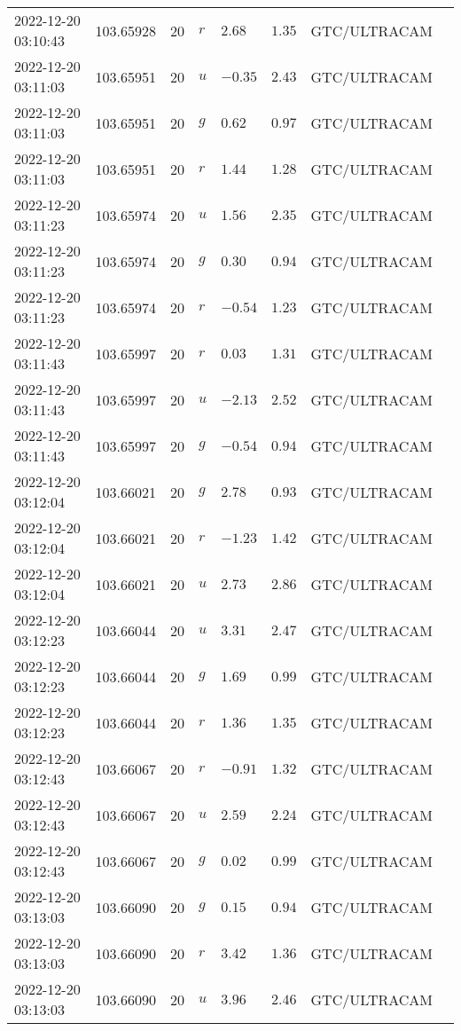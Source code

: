 \documentclass{nature_plusfigure}
\begin{document}
\begin{supplement}
\begin{center}
\begin{longtable}{llllllll}
2022-12-20 03:10:43 & 103.65928 & 20 & $r$ & $2.68$ & $1.35$ & GTC/ULTRACAM &  \\ 
2022-12-20 03:11:03 & 103.65951 & 20 & $u$ & $-0.35$ & $2.43$ & GTC/ULTRACAM &  \\ 
2022-12-20 03:11:03 & 103.65951 & 20 & $g$ & $0.62$ & $0.97$ & GTC/ULTRACAM &  \\ 
2022-12-20 03:11:03 & 103.65951 & 20 & $r$ & $1.44$ & $1.28$ & GTC/ULTRACAM &  \\ 
2022-12-20 03:11:23 & 103.65974 & 20 & $u$ & $1.56$ & $2.35$ & GTC/ULTRACAM &  \\ 
2022-12-20 03:11:23 & 103.65974 & 20 & $g$ & $0.30$ & $0.94$ & GTC/ULTRACAM &  \\ 
2022-12-20 03:11:23 & 103.65974 & 20 & $r$ & $-0.54$ & $1.23$ & GTC/ULTRACAM &  \\ 
2022-12-20 03:11:43 & 103.65997 & 20 & $r$ & $0.03$ & $1.31$ & GTC/ULTRACAM &  \\ 
2022-12-20 03:11:43 & 103.65997 & 20 & $u$ & $-2.13$ & $2.52$ & GTC/ULTRACAM &  \\ 
2022-12-20 03:11:43 & 103.65997 & 20 & $g$ & $-0.54$ & $0.94$ & GTC/ULTRACAM &  \\ 
2022-12-20 03:12:04 & 103.66021 & 20 & $g$ & $2.78$ & $0.93$ & GTC/ULTRACAM &  \\ 
2022-12-20 03:12:04 & 103.66021 & 20 & $r$ & $-1.23$ & $1.42$ & GTC/ULTRACAM &  \\ 
2022-12-20 03:12:04 & 103.66021 & 20 & $u$ & $2.73$ & $2.86$ & GTC/ULTRACAM &  \\ 
2022-12-20 03:12:23 & 103.66044 & 20 & $u$ & $3.31$ & $2.47$ & GTC/ULTRACAM &  \\ 
2022-12-20 03:12:23 & 103.66044 & 20 & $g$ & $1.69$ & $0.99$ & GTC/ULTRACAM &  \\ 
2022-12-20 03:12:23 & 103.66044 & 20 & $r$ & $1.36$ & $1.35$ & GTC/ULTRACAM &  \\ 
2022-12-20 03:12:43 & 103.66067 & 20 & $r$ & $-0.91$ & $1.32$ & GTC/ULTRACAM &  \\ 
2022-12-20 03:12:43 & 103.66067 & 20 & $u$ & $2.59$ & $2.24$ & GTC/ULTRACAM &  \\ 
2022-12-20 03:12:43 & 103.66067 & 20 & $g$ & $0.02$ & $0.99$ & GTC/ULTRACAM &  \\ 
2022-12-20 03:13:03 & 103.66090 & 20 & $g$ & $0.15$ & $0.94$ & GTC/ULTRACAM &  \\ 
2022-12-20 03:13:03 & 103.66090 & 20 & $r$ & $3.42$ & $1.36$ & GTC/ULTRACAM &  \\ 
2022-12-20 03:13:03 & 103.66090 & 20 & $u$ & $3.96$ & $2.46$ & GTC/ULTRACAM &  \\ 

\end{longtable}
\end{center}
\end{supplement}
\end{document}
